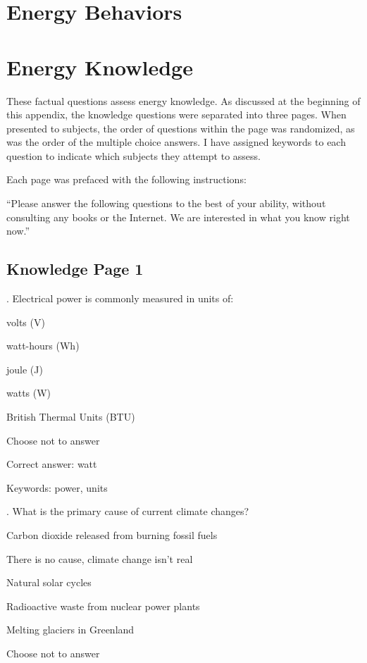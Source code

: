 
\section{Energy Behaviors}
\label{sec:behavior-items}



\section{Energy Knowledge}
\label{sec:knowledge-items}

These factual questions assess energy knowledge. As discussed at the beginning of this appendix, the knowledge questions were separated into three pages. When presented to subjects, the order of questions within the page was randomized, as was the order of the multiple choice answers. I have assigned keywords to each question to indicate which subjects they attempt to assess.

Each page was prefaced with the following instructions:

``Please answer the following questions to the best of your ability, without consulting any books or the Internet. We are interested in what you know right now.''

\subsection{Knowledge Page 1}

. Electrical power is commonly measured in units of:

\begin{answer}
	\item volts (V)
	\item watt-hours (Wh)
	\item joule (J)
	\item watts (W)
	\item British Thermal Units (BTU)
	\item Choose not to answer
\end{answer}

Correct answer: watt

Keywords: power, units

\vspace{5 mm}
. What is the primary cause of current climate changes?

\begin{answer}
	\item Carbon dioxide released from burning fossil fuels
	\item There is no cause, climate change isn't real
	\item Natural solar cycles
	\item Radioactive waste from nuclear power plants
	\item Melting glaciers in Greenland
	\item Choose not to answer
\end{answer}

